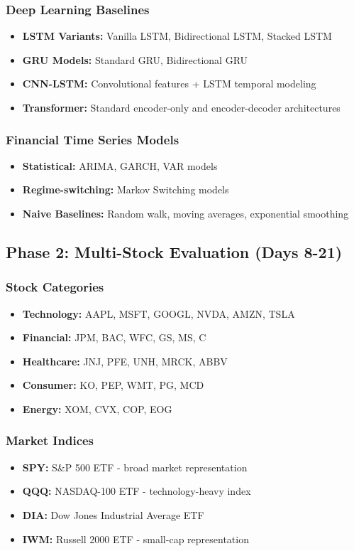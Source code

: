 \documentclass[11pt]{article}
\begin{document}
\subsubsection{Deep Learning Baselines}
\begin{itemize}
    \item \textbf{LSTM Variants:} Vanilla LSTM, Bidirectional LSTM, Stacked LSTM
    \item \textbf{GRU Models:} Standard GRU, Bidirectional GRU
    \item \textbf{CNN-LSTM:} Convolutional features + LSTM temporal modeling
    \item \textbf{Transformer:} Standard encoder-only and encoder-decoder architectures
\end{itemize}

\subsubsection{Financial Time Series Models}
\begin{itemize}
    \item \textbf{Statistical:} ARIMA, GARCH, VAR models
    \item \textbf{Regime-switching:} Markov Switching models
    \item \textbf{Naive Baselines:} Random walk, moving averages, exponential smoothing
\end{itemize}

\subsection{Phase 2: Multi-Stock Evaluation (Days 8-21)}

\subsubsection{Stock Categories}
\begin{itemize}
    \item \textbf{Technology:} AAPL, MSFT, GOOGL, NVDA, AMZN, TSLA
    \item \textbf{Financial:} JPM, BAC, WFC, GS, MS, C
    \item \textbf{Healthcare:} JNJ, PFE, UNH, MRCK, ABBV
    \item \textbf{Consumer:} KO, PEP, WMT, PG, MCD
    \item \textbf{Energy:} XOM, CVX, COP, EOG
\end{itemize}

\subsubsection{Market Indices}
\begin{itemize}
    \item \textbf{SPY:} S\&P 500 ETF - broad market representation
    \item \textbf{QQQ:} NASDAQ-100 ETF - technology-heavy index
    \item \textbf{DIA:} Dow Jones Industrial Average ETF
    \item \textbf{IWM:} Russell 2000 ETF - small-cap representation
\end{itemize}
\end{document}
